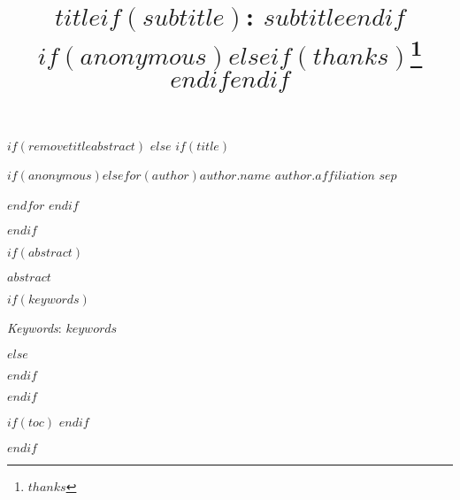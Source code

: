 \documentclass[$if(fontsize)$$fontsize$,$endif$$if(lang)$$babel-lang$,$endif$$if(papersize)$$papersize$,$endif$$for(classoption)$$classoption$$sep$,$endfor$]{article}
\title{$title$$if(subtitle)$: $subtitle$$endif$ $if(anonymous)$$else$$if(thanks)$\thanks{$thanks$} $endif$$endif$ }
\date{}
\newcommand*{\authorfont}{\fontfamily{phv}\selectfont}
\renewenvironment{abstract}
 {{%
    \setlength{\leftmargin}{0mm}
    \setlength{\rightmargin}{\leftmargin}%
  }%
  \relax}
 {\endlist}
\begin{document}

$if(removetitleabstract)$
$else$
$if(title)$

{%
\setlength{\parindent}{0pt}
\thispagestyle{plain}
{\fontsize{18}{20}\selectfont\raggedright
\maketitle  %

}

{
   \vskip 13.5pt\relax \normalsize\fontsize{11}{12}
$if(anonymous)$\hfill $else$$for(author)$\textbf{\authorfont $author.name$} \hskip 15pt \emph{\small $author.affiliation$}  $sep$ \par $endfor$ $endif$

}

}


$endif$



$if(abstract)$



\begin{abstract}

    \hbox{\vrule height .2pt width 39.14pc}

    \vskip 8.5pt %

\noindent $abstract$

$if(keywords)$

\vskip 8.5pt \noindent \emph{Keywords}: $keywords$ \par

    \hbox{\vrule height .2pt width 39.14pc}


$else$

    \hbox{\vrule height .2pt width 39.14pc}

$endif$

\end{abstract}

$endif$

\vskip -8.5pt

$if(toc)$
{
\hypersetup{linkcolor=black}
\setcounter{tocdepth}{$toc-depth$}
\tableofcontents
}
$endif$

$endif$ %
\end{document}
